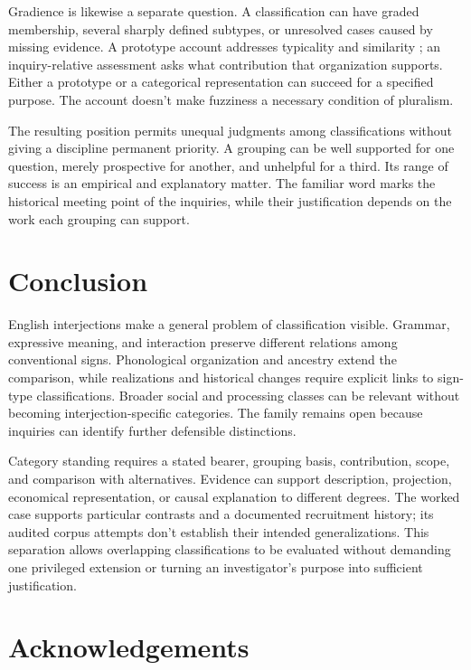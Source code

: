 \documentclass[12pt]{article}
\newif\ifblind
\begin{document}
Gradience is likewise a separate question. A classification can
have graded membership, several sharply defined subtypes, or
unresolved cases caused by missing evidence. A prototype account
addresses typicality and similarity \citep{rosch1975,taylor2003};
an inquiry-relative assessment asks what contribution that organization
supports. Either a prototype or a categorical representation
can succeed for a specified purpose. The account doesn't
make fuzziness a necessary condition of pluralism.

The resulting position permits unequal judgments among classifications
without giving a discipline permanent priority. A grouping can
be well supported for one question, merely prospective for another,
and unhelpful for a third. Its range of success is an empirical
and explanatory matter. The familiar word 
marks the historical meeting point of the inquiries, while their
justification depends on the work each grouping can support.

\section{Conclusion}\label{sec:conclusion}

English interjections make a general problem of classification
visible. Grammar, expressive meaning, and interaction preserve
different relations among conventional signs. Phonological organization
and ancestry extend the comparison, while realizations and historical
changes require explicit links to sign-type classifications. Broader
social and processing classes can be relevant without becoming
interjection-specific categories. The family remains open because
inquiries can identify further defensible distinctions.

Category standing requires a stated bearer, grouping basis,
contribution, scope, and comparison with alternatives. Evidence
can support description, projection, economical representation,
or causal explanation to different degrees. The worked case
supports particular contrasts and a documented recruitment history;
its audited corpus attempts don't establish their intended
generalizations. This separation allows overlapping classifications
to be evaluated without demanding one privileged extension or
turning an investigator's purpose into sufficient justification.

\ifblind\else
\section*{Acknowledgements}
\end{document}
